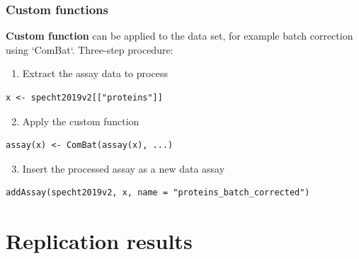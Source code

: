 \documentclass{beamer}
\newcommand{\frametitlesection}[1]{\frametitle{\centering #1 \footnotesize \hspace{0pt plus 1 filll} \insertsection}}
\begin{document}
\begin{frame}[fragile]
    \frametitlesection{Custom functions}

    \textbf{Custom function} can be applied to the data set, for example batch 
    correction using `ComBat`. Three-step procedure:
    
    \begin{enumerate}
        \item Extract the assay data to process
    \end{enumerate}
    
    \begin{lstlisting}[basicstyle = \scriptsize\ttfamily\color{vdgray}]
x <- specht2019v2[["proteins"]]
    \end{lstlisting}

    \begin{enumerate}
        \setcounter{enumi}{1}
        \item Apply the custom function
    \end{enumerate}
    
    \begin{lstlisting}[firstnumber=2,  basicstyle = \scriptsize\ttfamily\color{vdgray}]
assay(x) <- ComBat(assay(x), ...)
    \end{lstlisting}
    
    \begin{enumerate}
        \setcounter{enumi}{2}
        \item Insert the processed assay as a new data assay
    \end{enumerate}
    
    \begin{lstlisting}[firstnumber=3,  basicstyle = \scriptsize\ttfamily\color{vdgray}]
addAssay(specht2019v2, x, name = "proteins_batch_corrected")
    \end{lstlisting}


\end{frame}


\section{Replication results}
\end{document}
